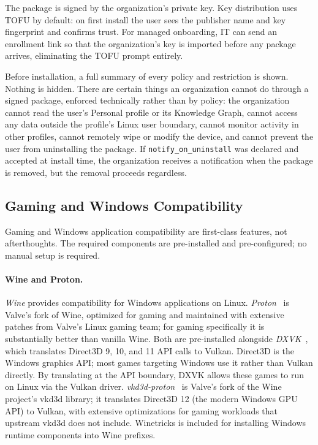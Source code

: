 The package is signed by the organization's private key. Key distribution uses
TOFU by default: on first install the user sees the publisher name and key
fingerprint and confirms trust. For managed onboarding, IT can send an
enrollment link so that the organization's key is imported before any package
arrives, eliminating the TOFU prompt entirely.

Before installation, a full summary of every policy and restriction is shown.
Nothing is hidden. There are certain things an organization cannot do through
a signed package, enforced technically rather than by policy: the organization
cannot read the user's Personal profile or its Knowledge Graph, cannot access
any data outside the profile's Linux user boundary, cannot monitor activity
in other profiles, cannot remotely wipe or modify the device, and cannot
prevent the user from uninstalling the package. If \texttt{notify\_on\_uninstall}
was declared and accepted at install time, the organization receives a
notification when the package is removed, but the removal proceeds regardless.

\subsection{Gaming and Windows Compatibility}
\label{sec:gaming}

Gaming and Windows application compatibility are first-class features, not
afterthoughts. The required components are pre-installed and pre-configured;
no manual setup is required.

\paragraph{Wine and Proton.}
\emph{Wine} provides compatibility for Windows applications on Linux.
\emph{Proton}~\cite{proton} is Valve's fork of Wine, optimized for gaming
and maintained with extensive patches from Valve's Linux gaming team; for gaming specifically
it is substantially better than vanilla Wine. Both are pre-installed alongside
\emph{DXVK}~\cite{dxvk}, which translates Direct3D 9, 10, and 11 API
calls to Vulkan. Direct3D is the Windows graphics API; most games targeting
Windows use it rather than Vulkan directly. By translating at the API boundary,
DXVK allows these games to run on Linux via the Vulkan driver.
\emph{vkd3d-proton}~\cite{vkd3d:proton} is Valve's fork of the Wine project's
vkd3d library; it translates Direct3D 12 (the modern Windows GPU API) to
Vulkan, with extensive optimizations for gaming workloads that upstream vkd3d
does not include. Winetricks is included for installing Windows runtime components
into Wine prefixes.

